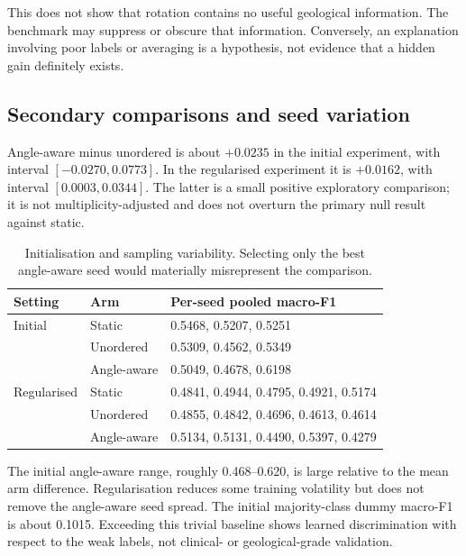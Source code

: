 This does not show that rotation contains no useful geological information. The benchmark may suppress or obscure that information. Conversely, an explanation involving poor labels or averaging is a hypothesis, not evidence that a hidden gain definitely exists.

\subsection{Secondary comparisons and seed variation}
Angle-aware minus unordered is about $+0.0235$ in the initial experiment, with interval $[-0.0270,0.0773]$. In the regularised experiment it is $+0.0162$, with interval $[0.0003,0.0344]$. The latter is a small positive exploratory comparison; it is not multiplicity-adjusted and does not overturn the primary null result against static.

\begin{table}[htbp]\centering\small
\begin{tabularx}{\linewidth}{@{}llX@{}}\toprule Setting & Arm & Per-seed pooled macro-F1\\\midrule
Initial & Static & 0.5468, 0.5207, 0.5251\\
 & Unordered & 0.5309, 0.4562, 0.5349\\
 & Angle-aware & 0.5049, 0.4678, 0.6198\\\midrule
Regularised & Static & 0.4841, 0.4944, 0.4795, 0.4921, 0.5174\\
 & Unordered & 0.4855, 0.4842, 0.4696, 0.4613, 0.4614\\
 & Angle-aware & 0.5134, 0.5131, 0.4490, 0.5397, 0.4279\\\bottomrule
\end{tabularx}
\caption{Initialisation and sampling variability. Selecting only the best angle-aware seed would materially misrepresent the comparison.}
\end{table}
The initial angle-aware range, roughly 0.468--0.620, is large relative to the mean arm difference. Regularisation reduces some training volatility but does not remove the angle-aware seed spread. The initial majority-class dummy macro-F1 is about 0.1015. Exceeding this trivial baseline shows learned discrimination with respect to the weak labels, not clinical- or geological-grade validation.

